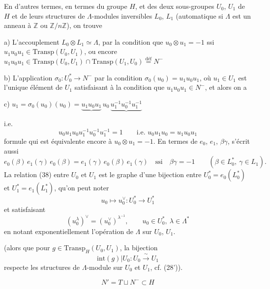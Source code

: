 \documentclass[11pt,a4paper]{article}
\begin{document}
En d'autres termes, en termes du groupe $H$, et des deux sous-groupes $U_0$, $U_1$ de $H$ et de leurs structures de $\Lambda$-modules inversibles $L_0$, $L_1$ (automatique si $\Lambda$ est un anneau  à $\mathbb{Z}$ ou $\mathbb{Z}/n\mathbb{Z}$), on trouve

a) L'accouplement $L_0 \otimes L_1 \simeq \Lambda$, par la condition que $u_0 \otimes u_1 = -1$ ssi $u_1 u_0 u_1 \in \mathrm{Transp}(U_0, U_1)$, ou encore $u_1 u_0 u_1 \in \mathrm{Transp}(U_0, U_1) \cap \mathrm{Transp}(U_1, U_0) \overset{\mathrm{déf}}{=} N^-$

b) L'application $\sigma_0 : U_0^* \longrightarrow N^-$ par la condition $\sigma_0(u_0) = u_1 u_0 u_1$, où $u_1 \in U_1$ est l'unique élément de $U_1$ satisfaisant à la condition que $u_1 u_0 u_1 \in N^-$, et alors on a

c) $u_1 = \sigma_0(u_0)(u_0) = \underbrace{u_1 u_0 u_1}\, u_0\, \underbrace{u_1^{-1} u_0^{-1} u_1^{-1}}$

i.e.
\[
u_0 u_1 u_0 u_1^{-1} u_0^{-1} u_1^{-1} = 1 \qquad \text{i.e. } u_0 u_1 u_0 = u_1 u_0 u_1 \tag{38}
\]
formule qui est équivalente encore à $u_0 \otimes u_1 = -1$. En termes de $e_0$, $e_1$, $\beta\gamma$, s'écrit aussi
\[
e_0(\beta)\, e_1(\gamma)\, e_0(\beta) = e_1(\gamma)\, e_0(\beta)\, e_1(\gamma) \quad \text{ssi} \quad \beta\gamma = -1 \qquad (\beta \in L_0^*,\ \gamma \in L_1) . \tag{39}
\]
La relation (38)  entre $U_0$ et $U_1$ est le graphe d'une bijection entre $U_0^* = e_0(L_0^*)$ et $U_1^* = e_1(L_1^*)$, qu'on peut noter
\[
u_0 \longmapsto u_0^\vee : U_0^* \longrightarrow U_1^*
\]
et satisfaisant
\[
(u_0^\lambda)^\vee = (u_0^\vee)^{\lambda^{-1}}, \qquad u_0 \in U_0^*,\ \lambda \in \Lambda^* \tag{40}
\]
en notant exponentiellement l'opération  de $\Lambda$ sur $U_0$, $U_1$.

(alors que pour $g \in \mathrm{Transp}_H(U_0, U_1)$, la bijection
\[
\mathrm{int}(g) | U_0 : U_0 \xrightarrow{\ \sim\ } U_1
\]
respecte les structures de $\Lambda$-module sur $U_0$ et $U_1$, cf. (28')).

\[
N' = T \sqcup N^- \subset H \tag{41}
\]
\end{document}
